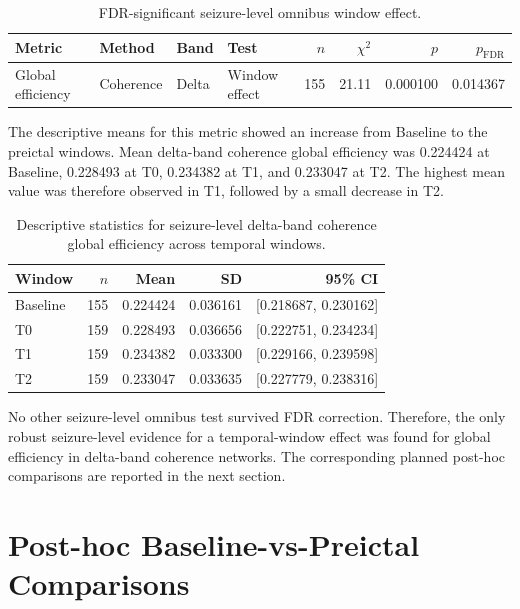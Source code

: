 \begin{table}[H]
    \centering
    \begin{tabular}{llllrrrr}
        \toprule
        Metric & Method & Band & Test & $n$ & $\chi^2$ & $p$ & $p_{\mathrm{FDR}}$ \\
        \midrule
        Global efficiency
        & Coherence
        & Delta
        & Window effect
        & 155
        & 21.11
        & 0.000100
        & 0.014367 \\
        \bottomrule
    \end{tabular}
    \caption{FDR-significant seizure-level omnibus window effect.}
    \label{tab:seizure-level-significant-omnibus}
\end{table}

The descriptive means for this metric showed an increase from Baseline to the
preictal windows. Mean delta-band coherence global efficiency was
\num{0.224424} at Baseline, \num{0.228493} at T0, \num{0.234382} at T1, and
\num{0.233047} at T2. The highest mean value was therefore observed in T1,
followed by a small decrease in T2.

\begin{table}[H]
    \centering
    \begin{tabular}{lrrrr}
        \toprule
        Window & $n$ & Mean & SD & 95\% CI \\
        \midrule
        Baseline & 155 & 0.224424 & 0.036161 & [0.218687, 0.230162] \\
        T0       & 159 & 0.228493 & 0.036656 & [0.222751, 0.234234] \\
        T1       & 159 & 0.234382 & 0.033300 & [0.229166, 0.239598] \\
        T2       & 159 & 0.233047 & 0.033635 & [0.227779, 0.238316] \\
        \bottomrule
    \end{tabular}
    \caption{Descriptive statistics for seizure-level delta-band coherence
    global efficiency across temporal windows.}
    \label{tab:seizure-level-global-efficiency-delta-coherence-descriptives}
\end{table}

No other seizure-level omnibus test survived FDR correction. Therefore, the
only robust seizure-level evidence for a temporal-window effect was found for
global efficiency in delta-band coherence networks. The corresponding planned
post-hoc comparisons are reported in the next section.

\section{Post-hoc Baseline-vs-Preictal Comparisons}
\label{sec:results-posthoc-baseline-preictal}

